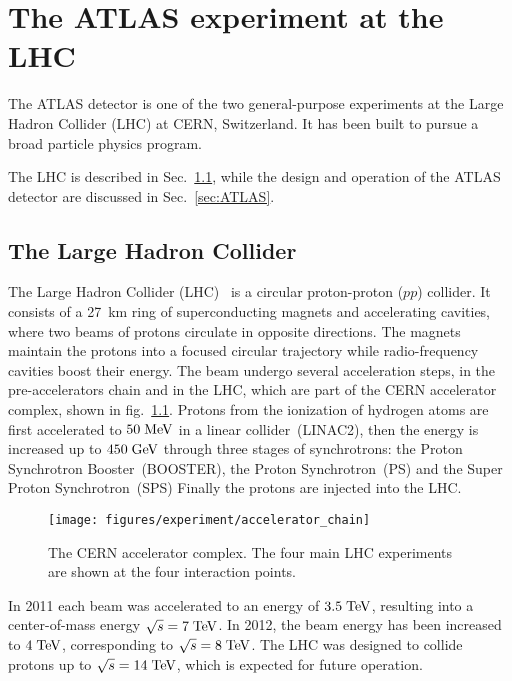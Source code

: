 \chapter{The ATLAS experiment at the LHC}
\label{sec:experiment}

The ATLAS detector is one of the two general-purpose experiments 
at the Large Hadron Collider (LHC) at CERN, Switzerland.
It has been built to pursue a broad particle physics program. 

The LHC is described in Sec.~\ref{sec:LHC}, while the design and operation of the 
ATLAS detector are discussed in Sec.~\ref{sec:ATLAS}.

\section{The Large Hadron Collider}
\label{sec:LHC}

The Large Hadron Collider (LHC)~\cite{LHCreport12, *LHCreport3} 
is a circular proton-proton ($pp$) collider.
It consists of a 27~km ring of superconducting magnets and
accelerating cavities, where two beams of protons circulate in
opposite directions.
The magnets maintain the protons into a focused circular trajectory while radio-frequency
cavities boost their energy.
The beam undergo several acceleration steps, in the pre-accelerators chain
and in the LHC, which are part of the CERN accelerator complex, shown in fig.~\ref{fig:lhc}.
Protons from the ionization of hydrogen atoms are first accelerated to \mbox{$50 \; \mathrm{MeV}$}
in a linear collider~(LINAC2), then the energy is increased up to
\mbox{$450 \; \mathrm{GeV}$} through three stages of synchrotrons: the Proton
Synchrotron Booster~(BOOSTER), the Proton Synchrotron~(PS) and the Super Proton Synchrotron~(SPS)
Finally the protons are injected into the LHC.

\begin{figure}[h]
\begin{center}
\texttt{[image: figures/experiment/accelerator\_chain]}
\caption[CERN Accelerator complex]{
  The CERN accelerator complex. The four main LHC experiments are
  shown at the four interaction points.}
\label{fig:lhc}
\end{center}
\end{figure}
 
In 2011 each beam was accelerated to an energy of \mbox{$3.5 \; \mathrm{TeV}$}, 
resulting into a center-of-mass energy \mbox{$\sqrt{s} = 7 \; \mathrm{TeV}$}.
In 2012, the beam energy has been increased to \mbox{$4 \; \mathrm{TeV}$}, 
corresponding to \mbox{$\sqrt{s} = 8 \; \mathrm{TeV}$}.
The LHC was designed to collide protons up to \mbox{$\sqrt{s} = 14 \; \mathrm{TeV}$},
which is expected for future operation.

